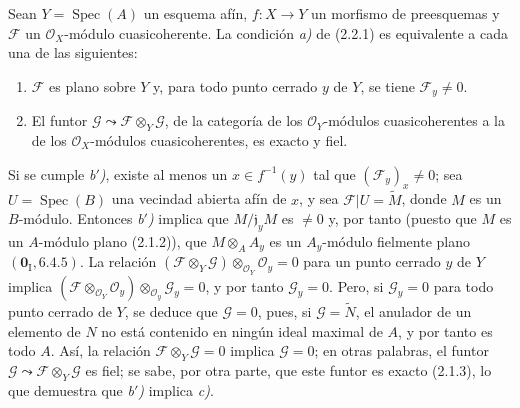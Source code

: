 \begin{proposition}[2.2.2]
\label{IV.2.2.2-fr}
Sean $Y=\operatorname{Spec}(A)$ un esquema afín, $f:X\to Y$ un morfismo de
preesquemas y $\mathscr F$ un $\mathcal O_X$-módulo cuasicoherente. La
condición \emph{a)} de \textup{(2.2.1)} es equivalente a cada una de las siguientes:
\begin{enumerate}
\item[\emph{b$'$)}] $\mathscr F$ es plano sobre $Y$ y, para todo punto \textup{cerrado}
$y$ de $Y$, se tiene $\mathscr F_y\neq0$.
\item[\emph{c)}] El funtor
$\mathscr G\leadsto\mathscr F\otimes_Y\mathscr G$, de la categoría de los
$\mathcal O_Y$-módulos cuasicoherentes a la de los
$\mathcal O_X$-módulos cuasicoherentes, es exacto y fiel.
\end{enumerate}
\end{proposition}

Si se cumple \emph{b$'$)}, existe al menos un $x\in f^{-1}(y)$ tal que
$(\mathscr F_y)_x\neq0$; sea $U=\operatorname{Spec}(B)$ una vecindad abierta
afín de $x$, y sea $\mathscr F|U=\widetilde M$, donde $M$ es un $B$-módulo.
Entonces \emph{b$'$)} implica que $M/\mathfrak j_yM$ es $\neq0$ y, por tanto
(puesto que $M$ es un $A$-módulo plano (2.1.2)), que
$M\otimes_A A_y$ es un $A_y$-módulo fielmente plano
$(\mathbf{0}_{\mathrm I},6.4.5)$. La relación
$(\mathscr F\otimes_Y\mathscr G)\otimes_{\mathcal O_Y}\mathcal O_y=0$ para un punto cerrado
$y$ de $Y$ implica
$(\mathscr F\otimes_{\mathcal O_Y}\mathcal O_y)\otimes_{\mathcal O_y}\mathscr G_y=0$,
y por tanto $\mathscr G_y=0$. Pero, si $\mathscr G_y=0$ para todo punto
cerrado de $Y$, se deduce que $\mathscr G=0$, pues, si
$\mathscr G=\widetilde N$, el anulador de un elemento de $N$ no está contenido
en ningún ideal maximal de $A$, y por tanto es todo $A$. Así, la relación
$\mathscr F\otimes_Y\mathscr G=0$ implica $\mathscr G=0$; en otras palabras,
el funtor $\mathscr G\leadsto\mathscr F\otimes_Y\mathscr G$ es fiel; se sabe,
por otra parte, que este funtor es exacto (2.1.3), lo que demuestra que
\emph{b$'$)} implica \emph{c)}.

